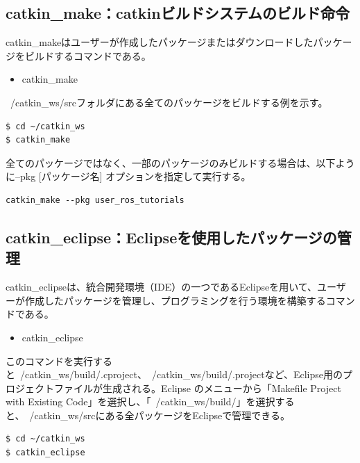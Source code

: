 \subsection{catkin\_make：catkinビルドシステムのビルド命令}

catkin\_makeはユーザーが作成したパッケージまたはダウンロードしたパッケージをビルドするコマンドである。

\begin{itemize}
\item  catkin\_make
\end{itemize}

~/catkin\_ws/srcフォルダにある全てのパッケージをビルドする例を示す。

\begin{lstlisting}[language=ROS]
$ cd ~/catkin_ws
$ catkin_make
\end{lstlisting}

全てのパッケージではなく、一部のパッケージのみビルドする場合は、以下ように--pkg [パッケージ名] オプションを指定して実行する。

\begin{lstlisting}[language=ROS]
catkin_make --pkg user_ros_tutorials
\end{lstlisting}

\subsection{catkin\_eclipse：Eclipseを使用したパッケージの管理}

catkin\_eclipseは、統合開発環境（IDE）の一つであるEclipseを用いて、ユーザーが作成したパッケージを管理し、プログラミングを行う環境を構築するコマンドである。

\begin{itemize}
\item catkin\_eclipse
\end{itemize}

このコマンドを実行すると~/catkin\_ws/build/.cproject、~/catkin\_ws/build/.projectなど、Eclipse用のプロジェクトファイルが生成される。Eclipse のメニューから「Makefile Project with Existing Code」を選択し、「~/catkin\_ws/build/」を選択すると、~/catkin\_ws/srcにある全パッケージをEclipseで管理できる。

\begin{lstlisting}[language=ROS]
$ cd ~/catkin_ws
$ catkin_eclipse
\end{lstlisting}

